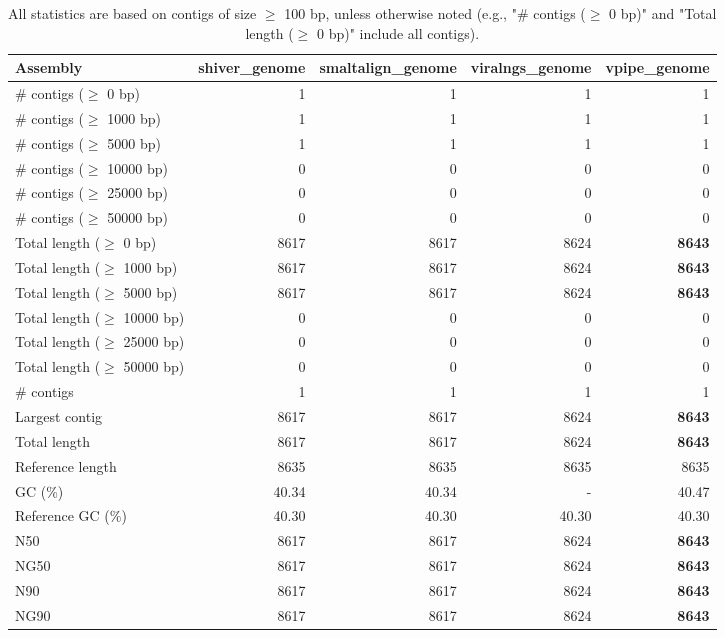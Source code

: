 \documentclass[12pt,a4paper]{article}
\begin{document}
\begin{table}[ht]
\begin{center}
\caption{All statistics are based on contigs of size $\geq$ 100 bp, unless otherwise noted (e.g., "\# contigs ($\geq$ 0 bp)" and "Total length ($\geq$ 0 bp)" include all contigs).}
\begin{tabular}{|l*{4}{|r}|}
\hline
Assembly & shiver\_genome & smaltalign\_genome & viralngs\_genome & vpipe\_genome \\ \hline
\# contigs ($\geq$ 0 bp) & 1 & 1 & 1 & 1 \\ \hline
\# contigs ($\geq$ 1000 bp) & 1 & 1 & 1 & 1 \\ \hline
\# contigs ($\geq$ 5000 bp) & 1 & 1 & 1 & 1 \\ \hline
\# contigs ($\geq$ 10000 bp) & 0 & 0 & 0 & 0 \\ \hline
\# contigs ($\geq$ 25000 bp) & 0 & 0 & 0 & 0 \\ \hline
\# contigs ($\geq$ 50000 bp) & 0 & 0 & 0 & 0 \\ \hline
Total length ($\geq$ 0 bp) & 8617 & 8617 & 8624 & {\bf 8643} \\ \hline
Total length ($\geq$ 1000 bp) & 8617 & 8617 & 8624 & {\bf 8643} \\ \hline
Total length ($\geq$ 5000 bp) & 8617 & 8617 & 8624 & {\bf 8643} \\ \hline
Total length ($\geq$ 10000 bp) & 0 & 0 & 0 & 0 \\ \hline
Total length ($\geq$ 25000 bp) & 0 & 0 & 0 & 0 \\ \hline
Total length ($\geq$ 50000 bp) & 0 & 0 & 0 & 0 \\ \hline
\# contigs & 1 & 1 & 1 & 1 \\ \hline
Largest contig & 8617 & 8617 & 8624 & {\bf 8643} \\ \hline
Total length & 8617 & 8617 & 8624 & {\bf 8643} \\ \hline
Reference length & 8635 & 8635 & 8635 & 8635 \\ \hline
GC (\%) & 40.34 & 40.34 & - & 40.47 \\ \hline
Reference GC (\%) & 40.30 & 40.30 & 40.30 & 40.30 \\ \hline
N50 & 8617 & 8617 & 8624 & {\bf 8643} \\ \hline
NG50 & 8617 & 8617 & 8624 & {\bf 8643} \\ \hline
N90 & 8617 & 8617 & 8624 & {\bf 8643} \\ \hline
NG90 & 8617 & 8617 & 8624 & {\bf 8643} \\ \hline

\end{tabular}
\end{center}
\end{table}
\end{document}
